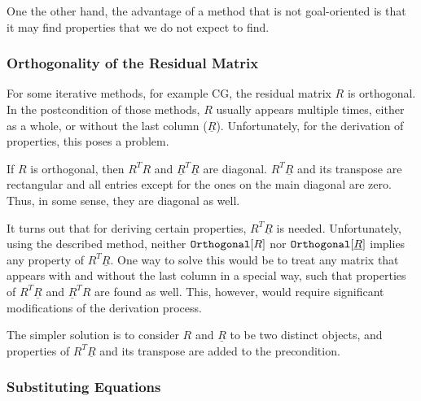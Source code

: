One the other hand, the advantage of a method that is not goal-oriented is that it may find properties that we do not expect to find.

\subsubsection{Orthogonality of the Residual Matrix}

For some iterative methods, for example CG, the residual matrix $R$ is orthogonal. In the postcondition of those methods, $R$ usually appears multiple times, either as a whole, or without the last column ($\underline{R}$). Unfortunately, for the derivation of properties, this poses a problem.

If $R$ is orthogonal, then $R^T R$ and $\underline{R}^T \underline{R}$ are diagonal. $R^T \underline{R}$ and its transpose are rectangular and all entries except for the ones on the main diagonal are zero. Thus, in some sense, they are diagonal as well.

It turns out that for deriving certain properties, $R^T \underline{R}$ is needed. Unfortunately, using the described method, neither $\text{\ttfamily Orthogonal}[R]$ nor $\text{\ttfamily Orthogonal}[\underline{R}]$ implies any property of $R^T \underline{R}$. One way to solve this would be to treat any matrix that appears with and without the last column in a special way, such that properties of $R^T \underline{R}$ and $\underline{R}^T R$ are found as well. This, however, would require significant modifications of the derivation process.

The simpler solution is to consider $R$ and $\underline{R}$ to be two distinct objects, and properties of $R^T \underline{R}$ and its transpose are added to the precondition. 

\subsubsection{Substituting Equations}

